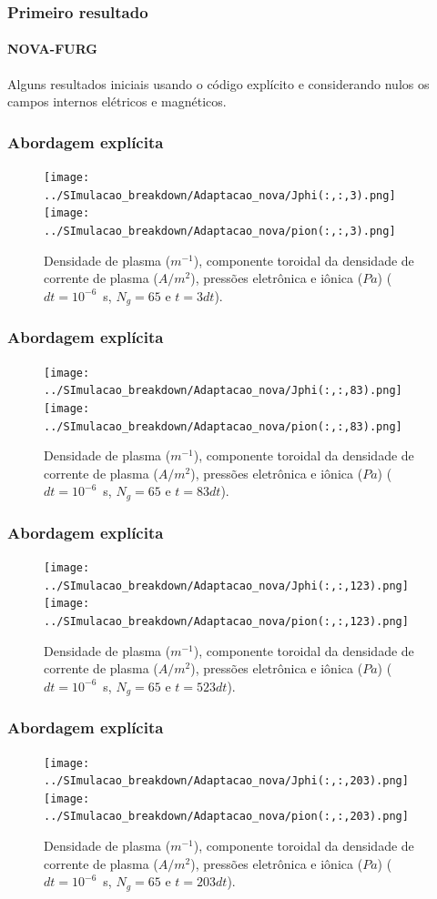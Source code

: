 \documentclass[aspectratio=169]{beamer}
\begin{document}
	\begin{frame}
		\frametitle{Primeiro resultado}
		\framesubtitle{NOVA-FURG}
Alguns resultados iniciais usando o código explícito e considerando nulos os campos internos elétricos e magnéticos. 
	\end{frame}
	\begin{frame}
		\frametitle{Abordagem explícita}
\begin{figure}[H]
\centering
\texttt{[image: ../SImulacao\_breakdown/Adaptacao\_nova/Jphi(:,:,3).png]} 
\texttt{[image: ../SImulacao\_breakdown/Adaptacao\_nova/pion(:,:,3).png]}  
\caption{Densidade de plasma ($m^{-1}$), componente toroidal da densidade de corrente de plasma ($A/m^2$), pressões eletrônica e iônica ($Pa$) ($dt=10^{-6}$\ s, $N_g = 65$ e $t=3dt$).}
\label{fig:simul1} 
\end{figure}
			
	\end{frame}
	\begin{frame}
		\frametitle{Abordagem explícita}

\begin{figure}[H]
\label{simul04}
\begin{center}
\texttt{[image: ../SImulacao\_breakdown/Adaptacao\_nova/Jphi(:,:,83).png]} 
\texttt{[image: ../SImulacao\_breakdown/Adaptacao\_nova/pion(:,:,83).png]}  
\caption{Densidade de plasma ($m^{-1}$), componente toroidal da densidade de corrente de plasma ($A/m^2$), pressões eletrônica e iônica ($Pa$) ($dt=10^{-6}$\ s, $N_g = 65$ e $t=83dt$).}
\end{center}
\end{figure}
	\end{frame}
	\begin{frame}
		\frametitle{Abordagem explícita}

\begin{figure}[H]
\label{simul4}
\begin{center}
\texttt{[image: ../SImulacao\_breakdown/Adaptacao\_nova/Jphi(:,:,123).png]}
\texttt{[image: ../SImulacao\_breakdown/Adaptacao\_nova/pion(:,:,123).png]}   
\caption{Densidade de plasma ($m^{-1}$), componente toroidal da densidade de corrente de plasma ($A/m^2$), pressões eletrônica e iônica ($Pa$) ($dt=10^{-6}$\ s, $N_g = 65$ e $t=523dt$).}
\end{center}
\end{figure}
	\end{frame}
	\begin{frame}
		\frametitle{Abordagem explícita}

\begin{figure}[H]
\label{simul8}
\begin{center}
\texttt{[image: ../SImulacao\_breakdown/Adaptacao\_nova/Jphi(:,:,203).png]}  
\texttt{[image: ../SImulacao\_breakdown/Adaptacao\_nova/pion(:,:,203).png]} 
\caption{Densidade de plasma ($m^{-1}$), componente toroidal da densidade de corrente de plasma ($A/m^2$), pressões eletrônica e iônica ($Pa$) ($dt=10^{-6}$\ s, $N_g = 65$ e $t=203dt$).}
\end{center}
\end{figure}
	\end{frame}
\end{document}
